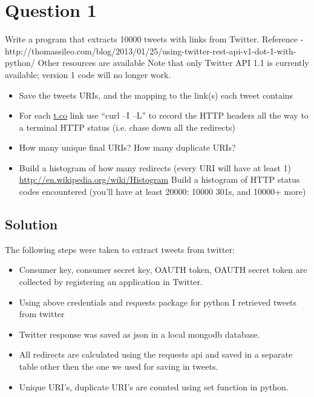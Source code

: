 


\section{Question 1}
\label{part1}

Write a program that extracts 10000 tweets with links from Twitter. 
Reference - http://thomassileo.com/blog/2013/01/25/using-twitter-rest-api-v1-dot-1-with-python/ 
Other resources are available 
Note that only Twitter API 1.1 is currently available; version 1 code will no longer work. 
	
\begin{itemize}
\item Save the tweets URIs, and the mapping to the link(s) each tweet contains 
\item For each \url{t.co} link use ``curl –I –L'' to record the HTTP headers all the way to a terminal HTTP status (i.e. chase down all the redirects)
\item How many unique final URIs? How many duplicate URIs?
\item Build a histogram of how many redirects (every URI will have at least 1) \url {http://en.wikipedia.org/wiki/Histogram}
Build a histogram of HTTP status codes encountered (you’ll have at least 20000: 10000 301s, and 10000+ more)
\end{itemize}
\subsection{Solution}

The following steps were taken to extract tweets from twitter:
\begin{itemize}
	\item Consumer key, consumer secret key, OAUTH token, OAUTH secret token are collected by registering an application 
	in Twitter.
	\item Using above credentials and requests package for python I retrieved tweets from twitter 
	\item Twitter response was saved as json in a local mongodb database.
	\item All redirects are calculated using the requests api and saved in a separate table other then the one we used for saving in tweets.
	\item Unique URI's, duplicate URI's are counted using set function in python.
\end{itemize}
\newpage